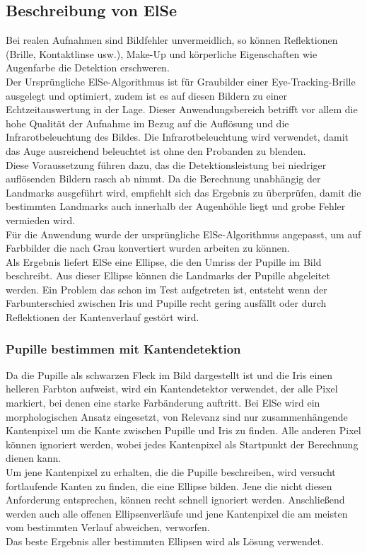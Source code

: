 \subsection{Beschreibung von ElSe}
Bei realen Aufnahmen sind Bildfehler unvermeidlich, so können Reflektionen (Brille, Kontaktlinse usw.), Make-Up und körperliche Eigenschaften wie Augenfarbe die Detektion erschweren.\\
Der Ursprüngliche ElSe-Algorithmus ist für Graubilder einer Eye-Tracking-Brille ausgelegt und optimiert, zudem ist es auf diesen Bildern zu einer Echtzeitauswertung in der Lage. Dieser Anwendungsbereich betrifft vor allem die hohe Qualität der Aufnahme im Bezug auf die Auflösung und die Infrarotbeleuchtung des Bildes. Die Infrarotbeleuchtung wird verwendet, damit das Auge ausreichend beleuchtet ist ohne den Probanden zu blenden.\\
Diese Voraussetzung führen dazu, das die Detektionsleistung bei niedriger auflösenden Bildern rasch ab nimmt. Da die Berechnung unabhängig der Landmarks ausgeführt wird, empfiehlt sich das Ergebnis zu überprüfen, damit die bestimmten Landmarks auch innerhalb der Augenhöhle liegt und grobe Fehler vermieden wird.\\
Für die Anwendung wurde der ursprüngliche ElSe-Algorithmus angepasst, um auf Farbbilder die nach Grau konvertiert wurden arbeiten zu können.\\
Als Ergebnis liefert ElSe eine Ellipse, die den Umriss der Pupille im Bild beschreibt. Aus dieser Ellipse können die Landmarks der Pupille abgeleitet werden.
Ein Problem das schon im Test aufgetreten ist, entsteht wenn der Farbunterschied zwischen Iris und Pupille recht gering ausfällt oder durch Reflektionen der Kantenverlauf gestört wird.
\subsubsection{Pupille bestimmen mit Kantendetektion}
Da die Pupille als schwarzen Fleck im Bild dargestellt ist und die Iris einen helleren Farbton aufweist, wird ein Kantendetektor verwendet, der alle Pixel markiert, bei denen eine starke Farbänderung auftritt. Bei ElSe wird ein morphologischen Ansatz eingesetzt, von Relevanz sind nur zusammenhängende Kantenpixel um die Kante zwischen Pupille und Iris zu finden. Alle anderen Pixel können ignoriert werden, wobei jedes Kantenpixel als Startpunkt der Berechnung dienen kann.\\
Um jene Kantenpixel zu erhalten, die die Pupille beschreiben, wird versucht fortlaufende Kanten zu finden, die eine Ellipse bilden. Jene die nicht diesen Anforderung entsprechen, können recht schnell ignoriert werden. Anschließend werden auch alle offenen Ellipsenverläufe und jene Kantenpixel die am meisten vom bestimmten Verlauf abweichen, verworfen.\\
Das beste Ergebnis aller bestimmten Ellipsen wird als Lösung verwendet.
